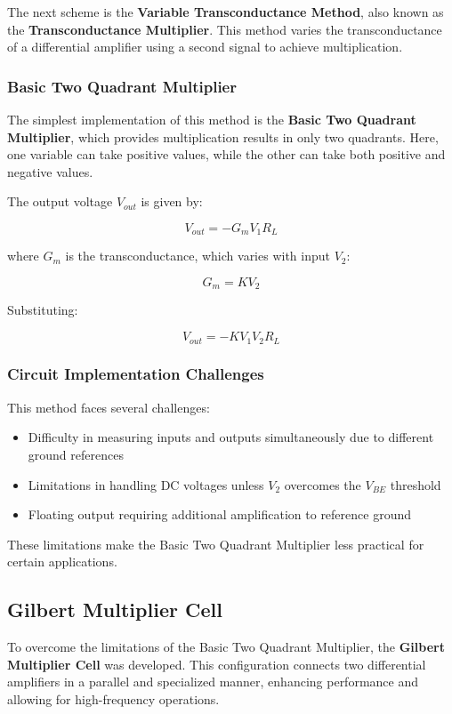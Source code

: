 \documentclass[a4paper,9pt,twoside,openany,twocolumn]{memoir}
\begin{document}
The next scheme is the \textbf{Variable Transconductance Method}, also known as the \textbf{Transconductance Multiplier}. This method varies the transconductance of a differential amplifier using a second signal to achieve multiplication.

\subsubsection{Basic Two Quadrant Multiplier}

The simplest implementation of this method is the \textbf{Basic Two Quadrant Multiplier}, which provides multiplication results in only two quadrants. Here, one variable can take positive values, while the other can take both positive and negative values.

The output voltage \( V_{out} \) is given by:

\[
V_{out} = -G_m V_1 R_L
\]

where \( G_m \) is the transconductance, which varies with input \( V_2 \):

\[
G_m = K V_2
\]

Substituting:

\[
V_{out} = -K V_1 V_2 R_L
\]

\subsubsection{Circuit Implementation Challenges}

This method faces several challenges:

\begin{itemize}
    \item Difficulty in measuring inputs and outputs simultaneously due to different ground references
    \item Limitations in handling DC voltages unless \( V_2 \) overcomes the \( V_{BE} \) threshold
    \item Floating output requiring additional amplification to reference ground
\end{itemize}

These limitations make the Basic Two Quadrant Multiplier less practical for certain applications.

\subsection{Gilbert Multiplier Cell}

To overcome the limitations of the Basic Two Quadrant Multiplier, the \textbf{Gilbert Multiplier Cell} was developed. This configuration connects two differential amplifiers in a parallel and specialized manner, enhancing performance and allowing for high-frequency operations.
\end{document}
